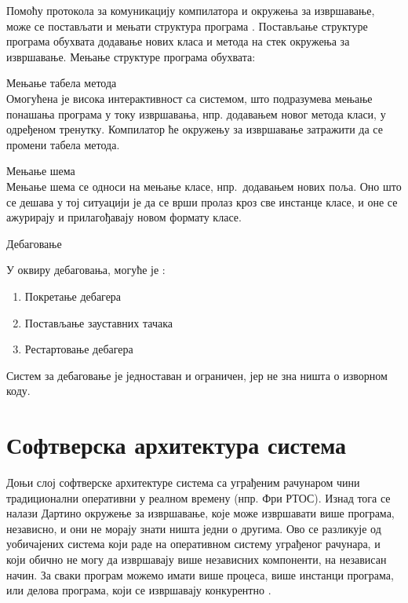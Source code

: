 \documentclass[12pt,oneside]{memoir}
\begin{document}
Помоћу протокола за комуникацију компилатора и окружења за извршавање, може се постављати и мењати структура програма \cite{Dartino}.
Постављање структуре програма обухвата додавање нових класа и метода на стек окружења за извршавање.
Мењање структуре програма обухвата:
\begin{description}
\item Мењање табела метода\\
Омогућена је висока интерактивност са системом, што подразумева мењање понашања програма у току извршавања, нпр. додавањем новог метода класи, у одређеном тренутку. Компилатор ће окружењу за извршавање затражити да се промени табела метода.
\item Мењање шема\\
Мењање шема се односи на мењање класе, нпр.~додавањем нових поља. Оно што се дешава у тој ситуацији је да се врши пролаз кроз све инстанце класе, и оне се ажурирају и прилагођавају новом формату класе.
\item Дебаговање

У оквиру дебаговања, могуће је \cite{Dartino}:
\begin{enumerate}
\item Покретање дебагера
\item Постављање зауставних тачака
\item Рестартовање дебагера
\end{enumerate}
Систем за дебаговање је једноставан и ограничен, јер не зна ништа о изворном коду.
\end{description}
\section{Софтверска архитектура система}
\label{arhitektura}

Доњи слој софтверске архитектуре система са уграђеним рачунаром чини традиционални оперативни у реалном времену (нпр. Фри РТОС). Изнад тога се налази Дартино окружење за извршавање, које може извршавати више програма, независно, и они не морају знати ништа једни о другима. Ово се разликује од уобичајених система који раде на оперативном систему уграђеног рачунара, и који обично не могу да извршавају више независних компоненти, на независан начин. За сваки програм можемо имати више процеса, више инстанци програма, или делова програма, који се извршавају конкурентно \cite{Dartino}.
\end{document}
